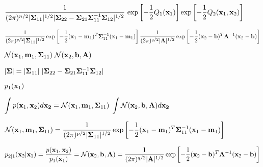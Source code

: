 \documentclass{article}
\def\lthtmlcheckvsize{\ifdim\ht\sizebox<\vsize 
  \ifdim\wd\sizebox<\hsize\expandafter\hfill\fi \expandafter\vfill
  \else\expandafter\vss\fi}%
\begin{document}
{\newpage\clearpage
{}%
$\displaystyle \frac{1}{(2\pi)^{n/2}|{\bf\Sigma}_{11}|^{1/2} |{\bf\Sigma}_{22}-{\bf\Sigma}_{21}{\bf\Sigma}_{11}^{-1}{\bf\Sigma}_{12}|^{1/2}} \,
\exp\left[-\frac{1}{2}Q_1({\bf x}_1)\right]
\exp\left[-\frac{1}{2}Q_2({\bf x}_1,{\bf x}_2)\right]$%
\lthtmlindisplaymathZ
\lthtmlcheckvsize\clearpage}

{\newpage\clearpage
{}%
$\displaystyle \frac{1}{(2\pi)^{p/2}|{\bf\Sigma}_{11}|^{1/2}}
\exp\left[-\frac{1}{2} ({\bf x}_1-{\bf m}_1)^T{\bf\Sigma}_{11}^{-1}({\bf x}_1-{\bf m}_1) \right]
\frac{1}{(2\pi)^{q/2}|{\bf A}|^{1/2}}\exp\left[-\frac{1}{2}({\bf x}_2-{\bf b})^T {\bf A}^{-1}({\bf x}_2-{\bf b}) \right]$%
\lthtmlindisplaymathZ
\lthtmlcheckvsize\clearpage}

{\newpage\clearpage
{}%
$\displaystyle {\cal N}({\bf x}_1,{\bf m}_1,{\bf\Sigma}_{11})\;{\cal N}({\bf x}_2,{\bf b},{\bf A})$%
\lthtmlindisplaymathZ
\lthtmlcheckvsize\clearpage}

{\newpage\clearpage
{}%
$\displaystyle |{\bf\Sigma}|=|{\bf\Sigma}_{11}|\; |{\bf\Sigma}_{22}-{\bf\Sigma}_{21}{\bf\Sigma}_{11}^{-1}{\bf\Sigma}_{12}|$%
\lthtmlindisplaymathZ
\lthtmlcheckvsize\clearpage}

{\newpage\clearpage
{}%
$\displaystyle p_1({\bf x}_1)$%
\lthtmlindisplaymathZ
\lthtmlcheckvsize\clearpage}

{\newpage\clearpage
{}%
$\displaystyle \int p({\bf x}_1,{\bf x}_2) d{\bf x_2}
={\cal N}({\bf x}_1,{\bf m}_1,{\bf\Sigma}_{11})\;\int {\cal N}({\bf x}_2,{\bf b},{\bf A}) d{\bf x_2}$%
\lthtmlindisplaymathZ
\lthtmlcheckvsize\clearpage}

{\newpage\clearpage
{}%
$\displaystyle {\cal N}({\bf x}_1,{\bf m}_1,{\bf\Sigma}_{11})
=\frac{1}{(2\pi)^{p/2}|{\bf\Sigma}_{11}|^{1/2}}
\exp\left[-\frac{1}{2}({\bf x}_1-{\bf m}_1)^T{\bf\Sigma}_{11}^{-1}({\bf x}_1-{\bf m}_1)\right]$%
\lthtmlindisplaymathZ
\lthtmlcheckvsize\clearpage}

{\newpage\clearpage
{}%
$\displaystyle p_{2|1}({\bf x}_2|{\bf x}_1)=\frac{p({\bf x}_1,{\bf x}_2)}{p_1({\bf x}_1)}
={\cal N}({\bf x}_2,{\bf b},{\bf A})
=\frac{1}{(2\pi)^{q/2}|{\bf A}|^{1/2}}\exp\left[-\frac{1}{2}({\bf x}_2-{\bf b})^T {\bf A}^{-1}({\bf x}_2-{\bf b})\right]$%
\lthtmlindisplaymathZ
\lthtmlcheckvsize\clearpage}
\end{document}
